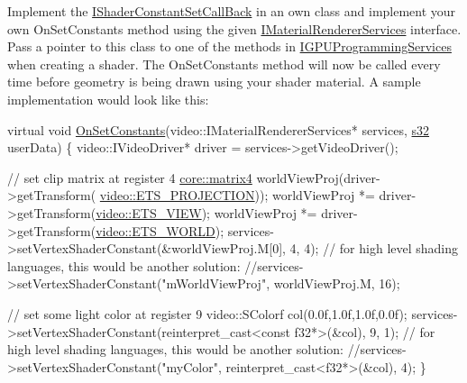 Implement the \hyperlink{classirr_1_1video_1_1IShaderConstantSetCallBack}{I\+Shader\+Constant\+Set\+Call\+Back} in an own class and implement your own On\+Set\+Constants method using the given \hyperlink{classirr_1_1video_1_1IMaterialRendererServices}{I\+Material\+Renderer\+Services} interface. Pass a pointer to this class to one of the methods in \hyperlink{classirr_1_1video_1_1IGPUProgrammingServices}{I\+G\+P\+U\+Programming\+Services} when creating a shader. The On\+Set\+Constants method will now be called every time before geometry is being drawn using your shader material. A sample implementation would look like this\+: 
\begin{DoxyCode}
\textcolor{keyword}{virtual} \textcolor{keywordtype}{void} \hyperlink{classirr_1_1video_1_1IShaderConstantSetCallBack_a91cf4eb8d20d278defaca4e3c9390396}{OnSetConstants}(video::IMaterialRendererServices* services, 
      \hyperlink{namespaceirr_ac66849b7a6ed16e30ebede579f9b47c6}{s32} userData)
\{
    video::IVideoDriver* driver = services->getVideoDriver();

    \textcolor{comment}{// set clip matrix at register 4}
    \hyperlink{namespaceirr_1_1core_a4c9d4e29899535971052810954a14431}{core::matrix4} worldViewProj(driver->getTransform(
      \hyperlink{namespaceirr_1_1video_a15b57657a320243be03ae6f66fcff43da3e02dc0a1b7e92ea9ff2a548d54e10cc}{video::ETS\_PROJECTION}));
    worldViewProj *= driver->getTransform(\hyperlink{namespaceirr_1_1video_a15b57657a320243be03ae6f66fcff43da9f4c5ade2cd956ef9dcc658fd8df2183}{video::ETS\_VIEW});
    worldViewProj *= driver->getTransform(\hyperlink{namespaceirr_1_1video_a15b57657a320243be03ae6f66fcff43daf0d9765331daace35b8443c471738305}{video::ETS\_WORLD});
    services->setVertexShaderConstant(&worldViewProj.M[0], 4, 4);
    \textcolor{comment}{// for high level shading languages, this would be another solution:}
    \textcolor{comment}{//services->setVertexShaderConstant("mWorldViewProj", worldViewProj.M, 16);}

    \textcolor{comment}{// set some light color at register 9}
    video::SColorf col(0.0f,1.0f,1.0f,0.0f);
    services->setVertexShaderConstant(reinterpret\_cast<const f32*>(&col), 9, 1);
    \textcolor{comment}{// for high level shading languages, this would be another solution:}
    \textcolor{comment}{//services->setVertexShaderConstant("myColor", reinterpret\_cast<f32*>(&col), 4);}
\}
\end{DoxyCode}
 
